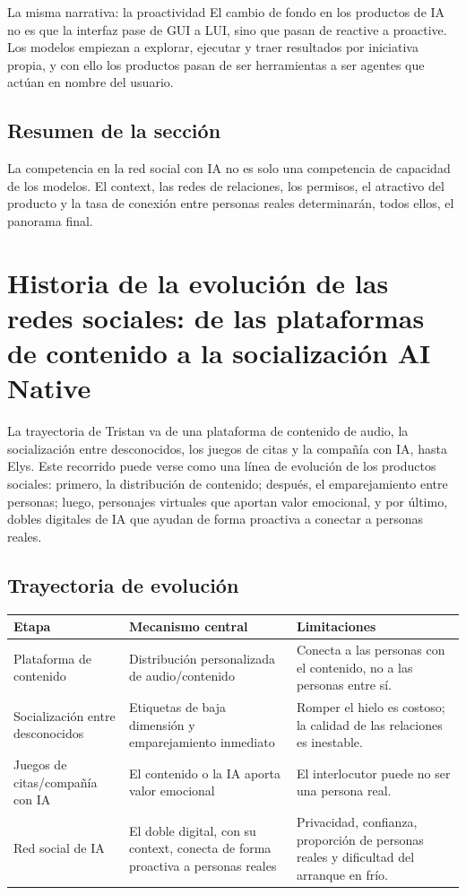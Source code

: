 \documentclass[a4paper]{article}
\begin{document}
\begin{importantbox}{La misma narrativa: la proactividad}
El cambio de fondo en los productos de IA no es que la interfaz pase de GUI a LUI, sino que pasan de reactive a proactive. Los modelos empiezan a explorar, ejecutar y traer resultados por iniciativa propia, y con ello los productos pasan de ser herramientas a ser agentes que actúan en nombre del usuario.
\end{importantbox}

\subsection{Resumen de la sección}

La competencia en la red social con IA no es solo una competencia de capacidad de los modelos. El context, las redes de relaciones, los permisos, el atractivo del producto y la tasa de conexión entre personas reales determinarán, todos ellos, el panorama final.
\section{Historia de la evolución de las redes sociales: de las plataformas de contenido a la socialización AI Native}

La trayectoria de Tristan va de una plataforma de contenido de audio, la socialización entre desconocidos, los juegos de citas y la compañía con IA, hasta Elys. Este recorrido puede verse como una línea de evolución de los productos sociales: primero, la distribución de contenido; después, el emparejamiento entre personas; luego, personajes virtuales que aportan valor emocional, y por último, dobles digitales de IA que ayudan de forma proactiva a conectar a personas reales.

\subsection{Trayectoria de evolución}

\noindent\begin{longtable}{p{}p{}p{}}
\toprule
Etapa & Mecanismo central & Limitaciones \\
\midrule
Plataforma de contenido & Distribución personalizada de audio/contenido & Conecta a las personas con el contenido, no a las personas entre sí. \\
Socialización entre desconocidos & Etiquetas de baja dimensión y emparejamiento inmediato & Romper el hielo es costoso; la calidad de las relaciones es inestable. \\
Juegos de citas/compañía con IA & El contenido o la IA aporta valor emocional & El interlocutor puede no ser una persona real. \\
Red social de IA & El doble digital, con su context, conecta de forma proactiva a personas reales & Privacidad, confianza, proporción de personas reales y dificultad del arranque en frío. \\
\bottomrule
\end{longtable}
\end{document}
